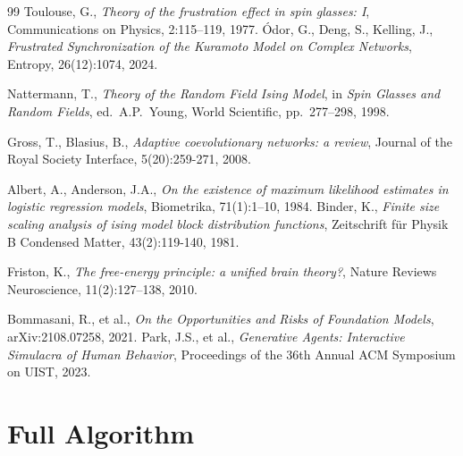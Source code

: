 ﻿\documentclass[11pt]{article}
\begin{document}
\begin{thebibliography}{99}
 Toulouse, G., \emph{Theory of the frustration effect in spin glasses: I}, Communications on Physics, 2:115--119, 1977.
 \'Odor, G., Deng, S., Kelling, J., \emph{Frustrated Synchronization of the Kuramoto Model on Complex Networks}, Entropy, 26(12):1074, 2024.

 Nattermann, T., \emph{Theory of the Random Field Ising Model}, in \emph{Spin Glasses and Random Fields}, ed.\ A.P.\ Young, World Scientific, pp.\ 277--298, 1998.

 Gross, T., Blasius, B., \emph{Adaptive coevolutionary networks: a review}, Journal of the Royal Society Interface, 5(20):259-271, 2008.

 Albert, A., Anderson, J.A., \emph{On the existence of maximum likelihood estimates in logistic regression models}, Biometrika, 71(1):1--10, 1984.
 Binder, K., \emph{Finite size scaling analysis of ising model block distribution functions}, Zeitschrift f\"ur Physik B Condensed Matter, 43(2):119-140, 1981.

 Friston, K., \emph{The free-energy principle: a unified brain theory?}, Nature Reviews Neuroscience, 11(2):127--138, 2010.

 Bommasani, R., et al., \emph{On the Opportunities and Risks of Foundation Models}, arXiv:2108.07258, 2021.
 Park, J.S., et al., \emph{Generative Agents: Interactive Simulacra of Human Behavior}, Proceedings of the 36th Annual ACM Symposium on UIST, 2023.

\end{thebibliography}

\appendix

\section{Full Algorithm}
\label{app:algorithm}
\end{document}
